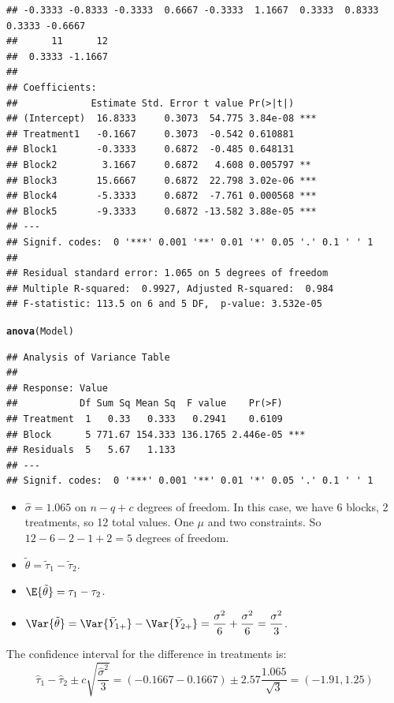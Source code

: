 \documentclass[oneside]{book}\usepackage[]{graphicx}\usepackage[dvipsnames,table,xcdraw]{xcolor}
\makeatletter
\newcommand{\hlstd}[1]{\textcolor[rgb]{0.345,0.345,0.345}{#1}}%
\newcommand{\hlkwd}[1]{\textcolor[rgb]{0.737,0.353,0.396}{\textbf{#1}}}%
\newenvironment{kframe}{%
 \def\at@end@of@kframe{}%
 \ifinner\ifhmode%
  \def\at@end@of@kframe{\end{minipage}}%
  \begin{minipage}{\columnwidth}%
 \fi\fi%
 \def\FrameCommand##1{\hskip\@totalleftmargin \hskip-\fboxsep
 \colorbox{shadecolor}{##1}\hskip-\fboxsep
     \hskip-\linewidth \hskip-\@totalleftmargin \hskip\columnwidth}%
 \MakeFramed {\advance\hsize-\width
   \@totalleftmargin\z@ \linewidth\hsize
   \@setminipage}}%
 {\par\unskip\endMakeFramed%
 \at@end@of@kframe}
\newenvironment{knitrout}{}{} %
\makeatother
\begin{document}
\begin{knitrout}
\begin{kframe}
\begin{verbatim}
## -0.3333 -0.8333 -0.3333  0.6667 -0.3333  1.1667  0.3333  0.8333  0.3333 -0.6667 
##      11      12 
##  0.3333 -1.1667 
## 
## Coefficients:
##             Estimate Std. Error t value Pr(>|t|)    
## (Intercept)  16.8333     0.3073  54.775 3.84e-08 ***
## Treatment1   -0.1667     0.3073  -0.542 0.610881    
## Block1       -0.3333     0.6872  -0.485 0.648131    
## Block2        3.1667     0.6872   4.608 0.005797 ** 
## Block3       15.6667     0.6872  22.798 3.02e-06 ***
## Block4       -5.3333     0.6872  -7.761 0.000568 ***
## Block5       -9.3333     0.6872 -13.582 3.88e-05 ***
## ---
## Signif. codes:  0 '***' 0.001 '**' 0.01 '*' 0.05 '.' 0.1 ' ' 1
## 
## Residual standard error: 1.065 on 5 degrees of freedom
## Multiple R-squared:  0.9927,	Adjusted R-squared:  0.984 
## F-statistic: 113.5 on 6 and 5 DF,  p-value: 3.532e-05
\end{verbatim}
\begin{alltt}
\hlkwd{anova}\hlstd{(Model)}
\end{alltt}
\begin{verbatim}
## Analysis of Variance Table
## 
## Response: Value
##           Df Sum Sq Mean Sq  F value    Pr(>F)    
## Treatment  1   0.33   0.333   0.2941    0.6109    
## Block      5 771.67 154.333 136.1765 2.446e-05 ***
## Residuals  5   5.67   1.133                       
## ---
## Signif. codes:  0 '***' 0.001 '**' 0.01 '*' 0.05 '.' 0.1 ' ' 1
\end{verbatim}
\end{kframe}
\end{knitrout}

\begin{itemize}
    \item $ \hat{\sigma}=1.065 $ on $ n-q+c $ degrees of freedom.
          In this case, we have 6 blocks, 2 treatments, so 12 total values.
          One $ \mu $ and two constraints. So $ 12-6-2-1+2=5 $ degrees of freedom.
    \item $ \tilde{\theta}=\tilde{\tau}_1-\tilde{\tau}_2 $.
    \item $ \E{\tilde{\theta}}=\tau_1-\tau_2 $.
    \item $ \displaystyle \Var{\tilde{\theta}}=\Var{\bar{Y}_{1+}}-\Var{\bar{Y}_{2+}}
              =\frac{\sigma^2}{6} +\frac{\sigma^2}{6}
              =\frac{\sigma^2}{3} $.
\end{itemize}
The confidence interval for the difference in treatments is:
\[ \hat{\tau}_1-\hat{\tau}_2\pm c \sqrt{\frac{\hat{\sigma}^2}{3}}
    =(-0.1667-0.1667)\pm 2.57 \frac{1.065}{\sqrt{3}} =(-1.91, 1.25) \]
\end{document}
